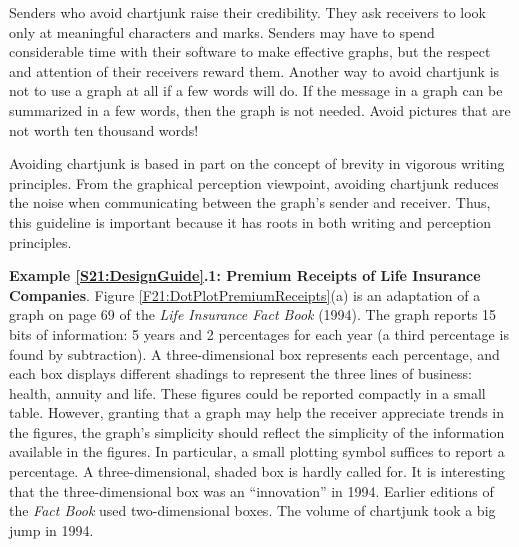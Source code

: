 
Senders who avoid chartjunk raise their credibility. They ask
receivers to look only at meaningful characters and marks. Senders
may have to spend considerable time with their software to make
effective graphs, but the respect and attention of their receivers
reward them. Another way to avoid chartjunk is not to use a graph at
all if a few words will do. If the message in a graph can be
summarized in a few words, then the graph is not needed. Avoid
pictures that are not worth ten thousand words!

Avoiding chartjunk is based in part on the concept of brevity in
vigorous writing principles. From the graphical perception
viewpoint, avoiding chartjunk reduces the noise when communicating
between the graph's sender and receiver. Thus, this guideline is
important because it has roots in both writing and perception
principles.

\linejed

\textbf{Example \ref{S21:DesignGuide}.1: Premium Receipts of Life
Insurance Companies}. Figure \ref{F21:DotPlotPremiumReceipts}(a) is
an adaptation of a graph on page 69 of the \emph{Life Insurance Fact
Book }(1994). The graph reports 15 bits of information: 5 years and
2 percentages for each year (a third percentage is found by
subtraction). A three-dimensional box represents each percentage,
and each box displays different shadings to represent the three
lines of business: health, annuity and life. These figures could be
reported compactly in a small table. However, granting that a graph
may help the receiver appreciate trends in the figures, the graph's
simplicity should reflect the simplicity of the information
available in the figures. In particular, a small plotting symbol
suffices to report a percentage. A three-dimensional, shaded box is
hardly called for. It is interesting that the three-dimensional box
was an ``innovation'' in 1994. Earlier editions of the \emph{Fact
Book} used two-dimensional boxes. The volume of chartjunk took a big
jump in 1994.

